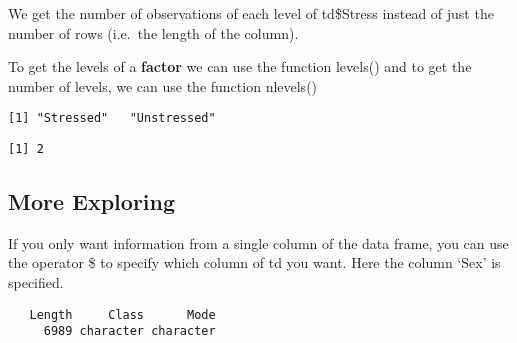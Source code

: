 \documentclass[
  10pt,
  letterpaper]{article}
\newenvironment{Shaded}{\begin{snugshade}}{\end{snugshade}}
\newcommand{\FunctionTok}[1]{\textcolor[rgb]{0.28,0.35,0.67}{#1}}
\newcommand{\NormalTok}[1]{\textcolor[rgb]{0.00,0.23,0.31}{#1}}
\newcommand{\SpecialCharTok}[1]{\textcolor[rgb]{0.37,0.37,0.37}{#1}}
\renewcommand\texttt[1]{{\ttfamily\color{BrickRed}#1}}
\begin{document}
We get the number of observations of each level of \texttt{td\$Stress}
instead of just the number of rows (i.e.~the \texttt{length} of the
column).

To get the levels of a \textbf{factor} we can use the function
\texttt{levels()} and to get the number of levels, we can use the
function \texttt{nlevels()}

\begin{Shaded}
\end{Shaded}

\begin{verbatim}
[1] "Stressed"   "Unstressed"
\end{verbatim}

\begin{Shaded}
\end{Shaded}

\begin{verbatim}
[1] 2
\end{verbatim}

\hypertarget{more-exploring}{%
\subsection{More Exploring}\label{more-exploring}}

If you only want information from a single column of the data frame, you
can use the operator \texttt{\$} to specify which column of \texttt{td}
you want. Here the column `Sex' is specified.

\begin{Shaded}
\end{Shaded}

\begin{verbatim}
   Length     Class      Mode 
     6989 character character 
\end{verbatim}

\begin{Shaded}
\end{Shaded}
\end{document}
